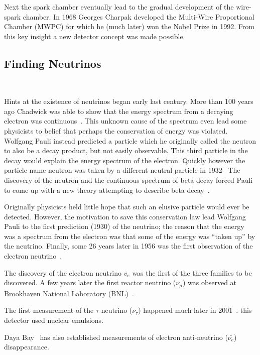 Next the spark chamber eventually lead to the gradual development of the wire-spark chamber.
In 1968 Georges Charpak developed the Multi-Wire Proportional Chamber (MWPC) for which he (much later) won the Nobel Prize in 1992.
From this key insight a new detector concept was made possible.

\subsection{Finding Neutrinos}
~\label{sec:neutrinos}

Hints at the existence of neutrinos began early last century.
More than 100 years ago Chadwick was able to show that the energy spectrum from a decaying electron was continuous~\citep{Chadwick:1914zz}.
This unknown cause of the spectrum even lead some physicists to belief that perhaps the conservation of energy was violated.
Wolfgang Pauli instead predicted a particle which he originally called the neutron to also be a decay product, but not easily observable.
This third particle in the decay would explain the energy spectrum of the electron.
Quickly however the particle name neutron was taken by a different neutral particle in 1932~\citep{Chadwick1932PossibleEO}
The discovery of the neutron and the continuous spectrum of beta decay forced Pauli to come up with a new theory attempting to describe beta decay~\citep{pauli_1934}.

Originally physicists held little hope that such an elusive particle would ever be detected.
However, the motivation to save this conservation law lead Wolfgang Pauli to the first prediction (1930) of the neutrino; the reason that the energy was a spectrum from the electron was that some of the energy was ``taken up'' by the neutrino.
Finally, some 26 years later in 1956 was the first observation of the electron neutrino~\citep{first_neutrino_measurement}.

The discovery of the electron neutrino $v_{e}$ was the first of the three families to be discovered.
A few years later the first reactor neutrino ($\nu_{\mu}$) was observed at Brookhaven National Laboratory (BNL)~\citep{PhysRevLett.9.36}.

The first measurement of the $\tau$ neutrino ($\nu_{\tau}$) happened much later in 2001~\citep{tau_neutrino_discovery_KODAMA2001218}.
this detector used nuclear emulsions.

Daya Bay~\citep{daya_bay_2012_neutrino_PhysRevLett.108.171803} has also established measurements of electron anti-neutrino ($\bar{\nu_{e}}$) disappearance.

